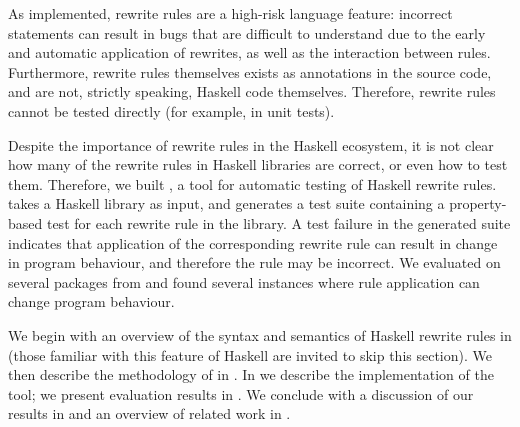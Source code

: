 As implemented, rewrite rules are a high-risk language feature: incorrect
statements can result in bugs that are difficult to understand due to the early
and automatic application of rewrites, as well as the interaction between rules.
Furthermore, rewrite rules themselves exists as annotations in the source code,
and are not, strictly speaking, Haskell code themselves. Therefore, rewrite
rules cannot be tested directly (for example, in unit tests).

Despite the importance of rewrite rules in the Haskell ecosystem, it is not
clear how many of the rewrite rules in Haskell libraries are correct, or even
how to test them. Therefore, we built \Rulecheck, a tool for automatic testing
of Haskell rewrite rules. \Rulecheck takes a Haskell library as input, and
generates a test suite containing a property-based test for each rewrite rule in
the library. A test failure in the generated suite indicates that application of
the corresponding rewrite rule can result in change in program behaviour, and
therefore the rule may be incorrect. We evaluated \Rulecheck on several packages
from \Hackage and found several instances where rule application can change
program behaviour.

We begin with an overview of the syntax and semantics of Haskell rewrite rules in
 (those familiar with this feature of Haskell are
invited to skip this section). We then describe the methodology of \Rulecheck in
. In  we describe the implementation
of the tool; we present evaluation results in . We conclude
with a discussion of our results in  and an overview of
related work in .
